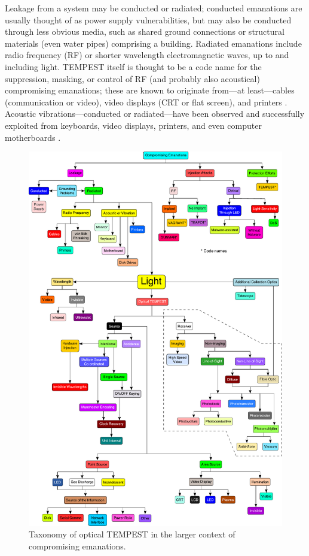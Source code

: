 \documentclass[a4paper,twoside,11pt]{book}
\begin{document}
Leakage from a system may be conducted or radiated; conducted emanations are
usually thought of as power supply vulnerabilities, but may also be conducted
through less obvious media, such as shared ground connections or structural
materials (even water pipes)
comprising a building. Radiated emanations include radio frequency (RF) or
shorter wavelength electromagnetic waves, up to and including light. TEMPEST
itself is
thought to be a code name for the suppression, masking, or control of RF (and
probably also acoustical)
compromising emanations; these are known to originate from---at least---cables
(communication or video), video displays (CRT or flat screen), and printers
\cite{NSAtempest2007,vanEck1985,Smulders1990,Kuhn2002,Grzesiak2010a}. Acoustic
vibrations---conducted or radiated---have been observed and successfully
exploited from keyboards, video displays, printers, and even computer
motherboards \cite{Wright1987,Asonov2004,Zhuang2005,Berger2006,Backes2010,
Genkin2013,Genkin2018a,Kubiak2018f}.

\begin{figure}[htp]
  \centering
  \includegraphics[width=\textwidth]{taxonomy.pdf}
  \caption{Taxonomy of optical TEMPEST in the larger context of compromising
    emanations.}
  \label{figure:taxonomy}
\end{figure}
\end{document}
